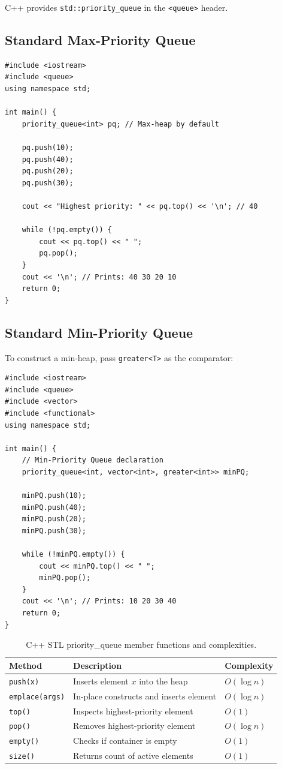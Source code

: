 C++ provides \texttt{std::priority\_queue} in the \texttt{<queue>} header.

\subsection{Standard Max-Priority Queue}
\begin{lstlisting}[style=cppstyle]
#include <iostream>
#include <queue>
using namespace std;

int main() {
    priority_queue<int> pq; // Max-heap by default

    pq.push(10);
    pq.push(40);
    pq.push(20);
    pq.push(30);

    cout << "Highest priority: " << pq.top() << '\n'; // 40

    while (!pq.empty()) {
        cout << pq.top() << " ";
        pq.pop();
    }
    cout << '\n'; // Prints: 40 30 20 10
    return 0;
}
\end{lstlisting}

\subsection{Standard Min-Priority Queue}
To construct a min-heap, pass \texttt{greater<T>} as the comparator:
\begin{lstlisting}[style=cppstyle]
#include <iostream>
#include <queue>
#include <vector>
#include <functional>
using namespace std;

int main() {
    // Min-Priority Queue declaration
    priority_queue<int, vector<int>, greater<int>> minPQ;

    minPQ.push(10);
    minPQ.push(40);
    minPQ.push(20);
    minPQ.push(30);

    while (!minPQ.empty()) {
        cout << minPQ.top() << " ";
        minPQ.pop();
    }
    cout << '\n'; // Prints: 10 20 30 40
    return 0;
}
\end{lstlisting}

\begin{table}[htbp]
\centering
\small
\begin{tabularx}{\textwidth}{l p{7cm} X}
\toprule
\textbf{Method} & \textbf{Description} & \textbf{Complexity} \\
\midrule
\texttt{push(x)} & Inserts element $x$ into the heap & $O(\log n)$ \\
\texttt{emplace(args)} & In-place constructs and inserts element & $O(\log n)$ \\
\texttt{top()} & Inspects highest-priority element & $O(1)$ \\
\texttt{pop()} & Removes highest-priority element & $O(\log n)$ \\
\texttt{empty()} & Checks if container is empty & $O(1)$ \\
\texttt{size()} & Returns count of active elements & $O(1)$ \\
\bottomrule
\end{tabularx}
\caption{C++ STL priority\_queue member functions and complexities.}
\end{table}

